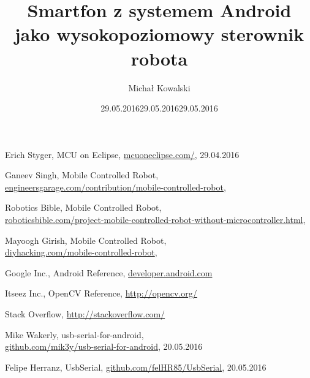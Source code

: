 \documentclass[openany, draft]{mgr} %
\author{Michał Kowalski} %
\title{Smartfon z systemem Android\\jako wysokopoziomowy sterownik robota}
\begin{document}
\maketitle
\tableofcontents
\listoffigures











\begin{thebibliography}{9}

Erich Styger, MCU on Eclipse,
\url{mcuoneclipse.com/},
29.04.2016

Ganeev Singh, Mobile Controlled Robot,\\
\url{engineersgarage.com/contribution/mobile-controlled-robot},
\date{29.05.2016}

Robotics Bible, Mobile Controlled Robot,\\
\url{roboticsbible.com/project-mobile-controlled-robot-without-microcontroller.html},\\
\date{29.05.2016}

Mayoogh Girish, Mobile Controlled Robot,\\
\url{diyhacking.com/mobile-controlled-robot},
\date{29.05.2016}

Google Inc., Android Reference,
\url{developer.android.com}

Itseez Inc., OpenCV Reference,
\url{http://opencv.org/}

Stack Overflow,
\url{http://stackoverflow.com/}

Mike Wakerly, usb-serial-for-android,\\
\url{github.com/mik3y/usb-serial-for-android},
20.05.2016

Felipe Herranz, UsbSerial,
\url{github.com/felHR85/UsbSerial},
20.05.2016

\end{thebibliography}
\end{document}
